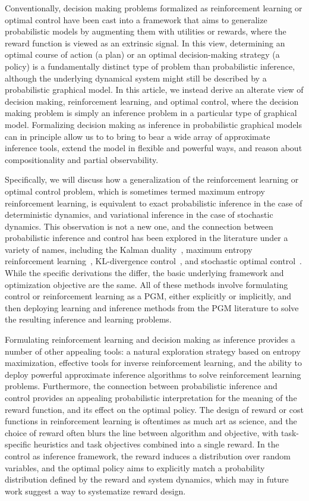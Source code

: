 Conventionally, decision making problems formalized as reinforcement learning or optimal control have been cast into a framework that aims to generalize probabilistic models by augmenting them with utilities or rewards, where the reward function is viewed as an extrinsic signal. In this view, determining an optimal course of action (a plan) or an optimal decision-making strategy (a policy) is a fundamentally distinct type of problem than probabilistic inference, although the underlying dynamical system might still be described by a probabilistic graphical model. In this article, we instead derive an alterate view of decision making, reinforcement learning, and optimal control, where the decision making problem is simply an inference problem in a particular type of graphical model. Formalizing decision making as inference in probabilistic graphical models can in principle allow us to to bring to bear a wide array of approximate inference tools, extend the model in flexible and powerful ways, and reason about compositionality and partial observability.

Specifically, we will discuss how a generalization of the reinforcement learning or optimal control problem, which is sometimes termed maximum entropy reinforcement learning, is equivalent to exact probabilistic inference in the case of deterministic dynamics, and variational inference in the case of stochastic dynamics. This observation is not a new one, and the connection between probabilistic inference and control has been explored in the literature under a variety of names, including the Kalman duality~\citep{todorov_kalman_duality}, maximum entropy reinforcement learning~\citep{ziebart_thesis}, KL-divergence control~\citep{kappen_pgm,kappen_oc}, and stochastic optimal control~\citep{toussaint_soc}. While the specific derivations the differ, the basic underlying framework and optimization objective are the same. All of these methods involve formulating control or reinforcement learning as a PGM, either explicitly or implicitly, and then deploying learning and inference methods from the PGM literature to solve the resulting inference and learning problems.

Formulating reinforcement learning and decision making as inference provides a number of other appealing tools: a natural exploration strategy based on entropy maximization, effective tools for inverse reinforcement learning, and the ability to deploy powerful approximate inference algorithms to solve reinforcement learning problems. Furthermore, the connection between probabilistic inference and control provides an appealing probabilistic interpretation for the meaning of the reward function, and its effect on the optimal policy. The design of reward or cost functions in reinforcement learning is oftentimes as much art as science, and the choice of reward often blurs the line between algorithm and objective, with task-specific heuristics and task objectives combined into a single reward. In the control as inference framework, the reward induces a distribution over random variables, and the optimal policy aims to explicitly match a probability distribution defined by the reward and system dynamics, which may in future work suggest a way to systematize reward design.

